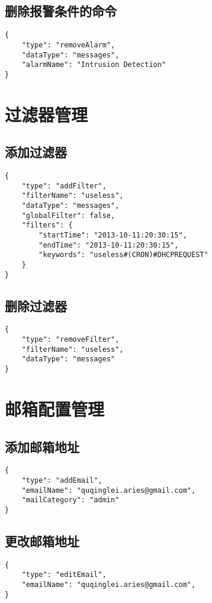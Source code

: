 \documentclass{article}
\begin{document}
\subsection{删除报警条件的命令}
\begin{verbatim}
{
    "type": "removeAlarm",
    "dataType": "messages",
    "alarmName": "Intrusion Detection"
}
\end{verbatim}

\section{过滤器管理}
\subsection{添加过滤器}
\begin{verbatim}
{
    "type": "addFilter",
    "filterName": "useless",
    "dataType": "messages",
    "globalFilter": false,
    "filters": {
        "startTime": "2013-10-11:20:30:15",
        "endTime": "2013-10-11:20:30:15",
        "keywords": "useless#(CRON)#DHCPREQUEST"
    }
}
\end{verbatim}
\subsection{删除过滤器}
\begin{verbatim}
{
    "type": "removeFilter",
    "filterName": "useless",
    "dataType": "messages"
}
\end{verbatim}

\section{邮箱配置管理}
\subsection{添加邮箱地址}
\begin{verbatim}
{
    "type": "addEmail",
    "emailName": "quqinglei.aries@gmail.com",
    "mailCategory": "admin"
}
\end{verbatim}

\subsection{更改邮箱地址}
\begin{verbatim}
{
    "type": "editEmail",
    "emailName": "quqinglei.aries@gmail.com",
}
\end{verbatim}
\end{document}
